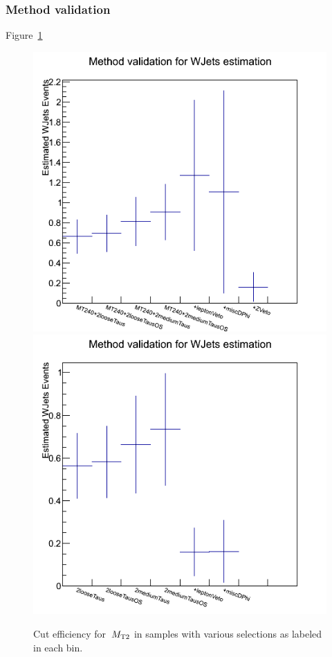 \subsubsection{Method validation}
Figure~\ref{fig:justification_bin1}  
\begin{figure}[htbp]
\centering
\includegraphics[angle=0,scale=0.35]{TauTauFigs/withMT2GT40.png}
\includegraphics[angle=0,scale=0.35]{TauTauFigs/withMT2GT40ZVeto.png} \\
\caption{Cut efficiency for $\,{M_{\rm T2}}$ %
in samples with various selections as labeled in each bin.}
\label{fig:justification_bin1}
\end{figure}
